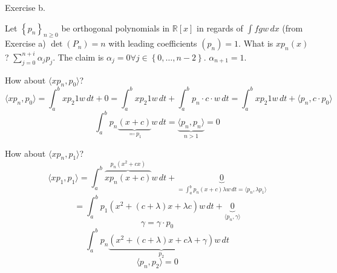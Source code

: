 \documentclass[a4paper]{article}
\theoremstyle{definition}
\newcommand\set[1]{\left\{#1\right\}}
\newcommand\ip[2]{\langle{#1},{#2}\rangle}
\begin{document}
Exercise b.

Let $\set{p_n}_{n\geq 0}$ be orthogonal polynomials in $\mathbb R[x]$ in regards of $\int fgw \, dx$ (from Exercise a)
$\det(P_n) = n$ with leading coefficients $(p_n) = 1$.
What is $xp_n(x)$? $\sum_{j=0}^{n+i} \alpha_j p_j$.
The claim is $\alpha_j = 0 \forall j \in \set{0,\dots, n-2}$. $\alpha_{n+1} = 1$.

How about $\ip{xp_n}{p_0}$?
\[ \ip{xp_n}{p_0} = \int_{a}^b xp_2 1 w \, dt + 0 = \int_{a}^b xp_2 1 w \, dt + \int_{a}^b p_n \cdot c \cdot w \, dt = \int_{a}^b xp_2 1 w \, dt + \ip{p_n}{c \cdot p_0} \]
\[ \int_a^b p_n\underbrace{(x + c)}_{\eqqcolon p_1} w \,dt = \underbrace{\ip{p_n}{p_n}}_{n > 1} = 0 \]

How about $\ip{xp_n}{p_1}$?
\[ \ip{xp_1}{p_1} = \int_a^b \overbrace{x p_n (x + c)}^{p_n (x^2 + cx)} w \, dt + \underbrace{0}_{= \int_a^b p_n(x + c) \lambda w \, dt = \ip{p_n}{\lambda p_1}} \]
\[ = \int_a^b p_1(x^2 + (c + \lambda) x + \lambda c) w \, dt + \underbrace{0}_{\ip{p_n}{\gamma}} \]
\[ \gamma = \gamma \cdot p_0 \]
\[ \int_a^b p_n \underbrace{\left(x^2 + (c + \lambda) x + c \lambda + \gamma\right)}_{p_2} w \, dt \]
\[ \ip{p_n}{p_2} = 0 \]
\end{document}
